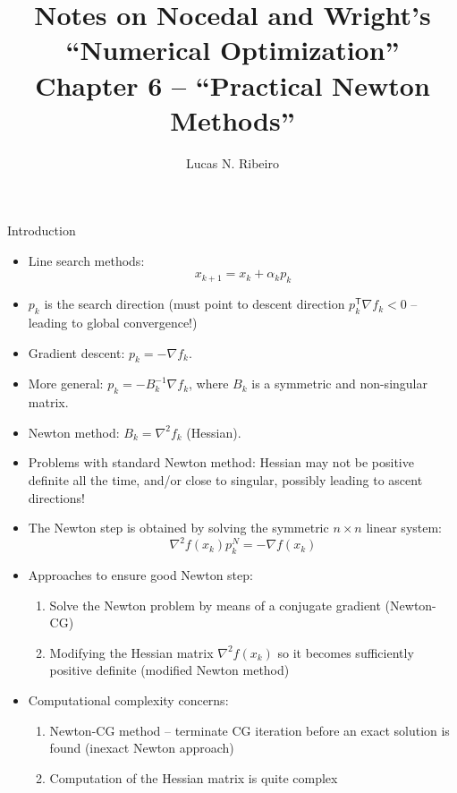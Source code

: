 \documentclass{beamer}
\title[Chapter 6]{Notes on Nocedal and Wright's ``Numerical Optimization''\\Chapter 6 --  ``Practical Newton Methods''}
\author{Lucas N. Ribeiro}
\date{}
\newcommand{\tran}{\mathsf{T}}
\begin{document}
 
\frame{\titlepage}
 
\begin{frame}[allowframebreaks]{Introduction}
	\begin{itemize}
		\item Line search methods:
		\[
			x_{k+1} = x_k + \alpha_k p_k
		\]
		\item $p_k$ is the search direction (must point to descent direction $p_k^\tran \nabla f_k <0$ -- leading to global convergence!)
		\item Gradient descent: $p_k = -\nabla f_k$.
		\item More general: $p_k = -B_k^{-1} \nabla f_k$, where $B_k$ is a symmetric and non-singular matrix.
		\item Newton method: $B_k = \nabla^2 f_k$ (Hessian).
		\item Problems with standard Newton method: Hessian may not be positive definite all the time, and/or close to singular, possibly leading to ascent directions!
		\item The Newton step is obtained by solving the symmetric $n\times n$ linear system:
		\[
			\nabla^2 f(x_k) p_k^N = -\nabla f(x_k)
		\]
		\item Approaches to ensure good Newton step:
		\begin{enumerate}
			\item Solve the Newton problem by means of a conjugate gradient (Newton-CG)
			\item Modifying the Hessian matrix $\nabla^2 f(x_k)$ so it becomes sufficiently positive definite (modified Newton method)
		\end{enumerate}
	
		\item Computational complexity concerns:
		\begin{enumerate}
			\item Newton-CG method -- terminate CG iteration before an exact solution is found (inexact Newton approach)
			\item Computation of the Hessian matrix is quite complex
		\end{enumerate}
	\end{itemize}
\end{frame}
\end{document}

